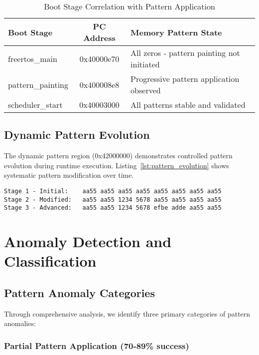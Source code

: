 \documentclass[11pt,a4paper]{article}
\begin{document}
\begin{table}[H]
\centering
\begin{tabular}{@{}lcp{6cm}@{}}
\toprule
\textbf{Boot Stage} & \textbf{PC Address} & \textbf{Memory Pattern State} \\
\midrule
freertos\_main    & 0x40000e70 & All zeros - pattern painting not initiated \\
pattern\_painting & 0x400008e8 & Progressive pattern application observed \\
scheduler\_start  & 0x40003000 & All patterns stable and validated \\
\bottomrule
\end{tabular}
\caption{Boot Stage Correlation with Pattern Application}
\label{tab:boot_correlation}
\end{table}

\subsection{Dynamic Pattern Evolution}

The dynamic pattern region (0x42000000) demonstrates controlled pattern evolution during runtime execution. Listing~\ref{lst:pattern_evolution} shows systematic pattern modification over time.

\begin{lstlisting}[style=hexdump, caption=Dynamic Pattern Evolution During Runtime, label=lst:pattern_evolution]
Stage 1 - Initial:    aa55 aa55 aa55 aa55 aa55 aa55 aa55 aa55
Stage 2 - Modified:   aa55 aa55 1234 5678 aa55 aa55 aa55 aa55  
Stage 3 - Advanced:   aa55 aa55 1234 5678 efbe adde aa55 aa55
\end{lstlisting}

\section{Anomaly Detection and Classification}

\subsection{Pattern Anomaly Categories}

Through comprehensive analysis, we identify three primary categories of pattern anomalies:

\subsubsection{Partial Pattern Application (70-89\% success)}
\end{document}
